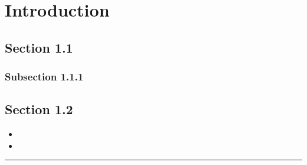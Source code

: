 \chapter{Introduction}
\lipsum[1-3]

\section{Section 1.1}
\lipsum[1-3]

\subsection{Subsection 1.1.1}
\lipsum[1-3]

\section{Section 1.2}
\begin{itemize}
    \setlength\itemsep{0em}
    \item \lipsum[1] 
    \item \lipsum[1]
\end{itemize}
\fancybreak{{*   *   *}}
